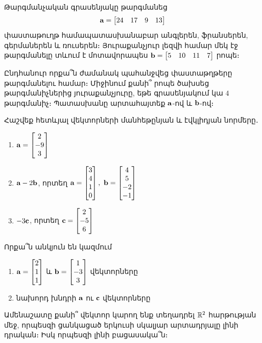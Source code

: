 \begin{problem}
Թարգմանչական գրասենյակը թարգմանեց 
\[\mathbf{a}=\begin{bmatrix}
    24 & 17 & 9 & 13
\end{bmatrix}\]
փաստաթուղթ համապատասխանաբար անգլերեն, ֆրանսերեն, գերմա\-նե\-րեն և ռուսերեն։ Յուրաքանչյուր լեզվի համար մեկ էջ թարգմանելը տևում է մոտավորապես $\mathbf{b}=\begin{bmatrix}
    5 & 10 & 11 & 7
\end{bmatrix}$ րոպե։ 

Ընդհանուր որքա՞ն ժամանակ պահանջվեց փաստաթղթերը թարգմա\-նե\-լու համար։ Միջինում քանի՞ րոպե ծախսեց թարգմանիչներից յուրա\-քանչ\-յուրը, եթե գրասենյակում կա $4$ թարգմանիչ։ Պատասխանը արտահայտեք $\mathbf{a}$-ով և $\mathbf{b}$-ով։
\end{problem}

\begin{problem}
Հաշվեք հետևյալ վեկտորների մանհեթընյան և էվկլիդյան նորմերը․

\begin{enumerate}[label={\alph*}․]
\item $\mathbf{a}= \begin{bmatrix} 2\\-9\\3 \end{bmatrix}$

\item $\mathbf{a}-2\mathbf{b}$, որտեղ $\mathbf{a}= \begin{bmatrix}3\\4\\1\\0\end{bmatrix},\  \mathbf{b} = \begin{bmatrix}4\\5\\-2\\-1\end{bmatrix}$

\item $-3\mathbf{c}$, որտեղ $\mathbf{c}= \begin{bmatrix}2\\-5\\6\end{bmatrix}$
\end{enumerate}
\end{problem}

\begin{problem}
Որքա՞ն անկյուն են կազմում
\begin{enumerate}[label={\alph*}․]
\item $\mathbf{a}= \begin{bmatrix} 2\\1\\1\end{bmatrix}$ և $\mathbf{b}= \begin{bmatrix} 1\\-3\\3\end{bmatrix}$ վեկտորները

\item նախորդ խնդրի $\mathbf{a}$ ու $\mathbf{c}$ վեկտորները
\end{enumerate}
\end{problem}


\begin{problem}
Ամենաշատը քանի՞ վեկտոր կարող ենք տեղադրել $\mathbb{R}^2$ հարթության մեջ, որպեսզի ցանկացած երկուսի սկալյար արտադրյալը լինի դրական։ Իսկ որպեսզի լինի բացասակա՞ն։
\end{problem}
